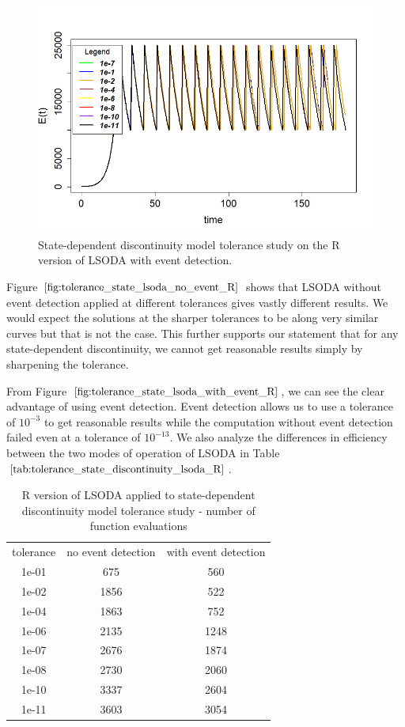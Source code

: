 \begin{figure}[h]
\centering
\includegraphics[width=0.7\linewidth]{./figures/tolerance_state_lsoda_with_event_R}
\caption{State-dependent discontinuity model tolerance study on the R version of LSODA with event detection.}
\label{fig:tolerance_state_lsoda_with_event_R}
\end{figure}

Figure $\ref{fig:tolerance_state_lsoda_no_event_R}$ shows that LSODA without event detection applied  at different tolerances gives vastly different results. We would expect the solutions at the sharper tolerances to be along very similar curves but that is not the case. This further supports our statement that for any state-dependent discontinuity, we cannot get reasonable results simply by sharpening the tolerance.

From Figure $\ref{fig:tolerance_state_lsoda_with_event_R}$, we can see the clear advantage of using event detection. Event detection allows us to use a tolerance of $10^{-3}$  to get reasonable results while the computation without event detection failed even at a tolerance of $10^{-13}$. We also analyze the differences in efficiency between the two modes of operation of LSODA in Table $\ref{tab:tolerance_state_discontinuity_lsoda_R}$.

\begin{table}[h]
\caption {R version of LSODA applied to state-dependent discontinuity model tolerance study - number of function evaluations} \label{tab:tolerance_state_discontinuity_lsoda_R} 
\begin{center}
\begin{tabular}{ c c c }
tolerance & no event detection & with event detection \\
1e-01 & 675 & 560 \\
1e-02 & 1856 & 522 \\
1e-04 & 1863 & 752 \\
1e-06 & 2135 & 1248 \\
1e-07 & 2676 & 1874 \\
1e-08 & 2730 & 2060 \\
1e-10 & 3337 & 2604 \\
1e-11 & 3603 & 3054 \\
\end{tabular}
\end{center}
\end{table}

